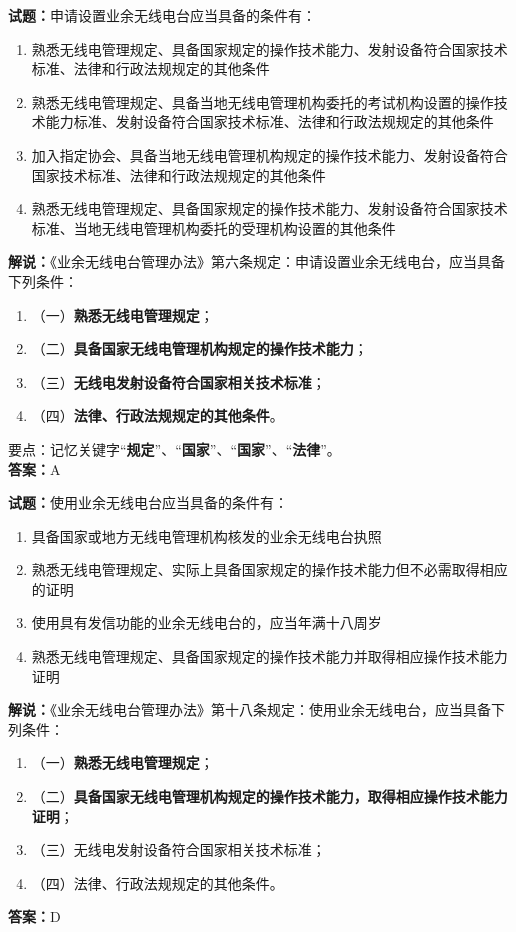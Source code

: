 \documentclass{ctexbook}
\begin{document}
\vspace{1em}

\textbf{试题：}申请设置业余无线电台应当具备的条件有：
\begin{enumerate}[leftmargin=3em]
  \item 熟悉无线电管理规定、具备国家规定的操作技术能力、发射设备符合国家技术标准、法律和行政法规规定的其他条件
  \item 熟悉无线电管理规定、具备当地无线电管理机构委托的考试机构设置的操作技术能力标准、发射设备符合国家技术标准、法律和行政法规规定的其他条件
  \item 加入指定协会、具备当地无线电管理机构规定的操作技术能力、发射设备符合国家技术标准、法律和行政法规规定的其他条件
  \item 熟悉无线电管理规定、具备国家规定的操作技术能力、发射设备符合国家技术标准、当地无线电管理机构委托的受理机构设置的其他条件
\end{enumerate}
\noindent\textbf{解说：}《业余无线电台管理办法》第六条规定：申请设置业余无线电台，应当具备下列条件：
\begin{enumerate}[label=, leftmargin=0.8em]
  \item （一）\textbf{熟悉无线电管理规定}；
  \item （二）\textbf{具备国家无线电管理机构规定的操作技术能力}；
  \item （三）\textbf{无线电发射设备符合国家相关技术标准}；
  \item （四）\textbf{法律、行政法规规定的其他条件}。
\end{enumerate}
要点：记忆关键字“\textbf{规定}”、“\textbf{国家}”、“\textbf{国家}”、“\textbf{法律}”。\\\noindent\textbf{答案：}A

\vspace{1em}

\textbf{试题：}使用业余无线电台应当具备的条件有：
\begin{enumerate}[leftmargin=3em]
  \item 具备国家或地方无线电管理机构核发的业余无线电台执照
  \item 熟悉无线电管理规定、实际上具备国家规定的操作技术能力但不必需取得相应的证明
  \item 使用具有发信功能的业余无线电台的，应当年满十八周岁
  \item 熟悉无线电管理规定、具备国家规定的操作技术能力并取得相应操作技术能力证明
\end{enumerate}
\noindent\textbf{解说：}《业余无线电台管理办法》第十八条规定：使用业余无线电台，应当具备下列条件：
\begin{enumerate}[label=, leftmargin=0.8em]
  \item （一）\textbf{熟悉无线电管理规定}；
  \item （二）\textbf{具备国家无线电管理机构规定的操作技术能力，取得相应操作技术能力证明}；
  \item （三）无线电发射设备符合国家相关技术标准；
  \item （四）法律、行政法规规定的其他条件。
\end{enumerate}
\noindent\textbf{答案：}D
\end{document}

